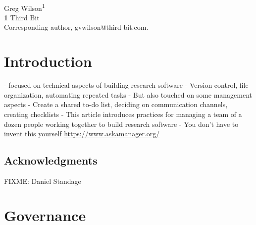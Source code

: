\documentclass[10pt,letterpaper]{article}
\begin{document}
\vspace*{0.2in}

\begin{flushleft}
{\Large
\textbf{}
}
\newline
\\
{Greg Wilson}\textsuperscript{1{\ddag}}
\\
\bigskip
\textbf{1} Third Bit\\
{\ddag} Corresponding author, gvwilson@third-bit.com.
\end{flushleft}

\section*{Introduction}

\begin{markdown}

- \cite{Wilson2014,Wilson2017} focused on technical aspects of building research software
  - Version control, file organization, automating repeated tasks
- But also touched on some management aspects
  - Create a shared to-do list, deciding on communication channels, creating checklists
- This article introduces practices for managing a team of a dozen people working together to build research software
- You don't have to invent this yourself \url{https://www.askamanager.org/}

\end{markdown}

\subsection*{Acknowledgments}

FIXME: Daniel Standage

\section{Governance}
\end{document}

